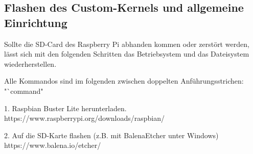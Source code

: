 \documentclass[12pt,a4paper,bibliography=totoc,listof=totoc]{scrartcl}
\begin{document}
\subsection{Flashen des Custom-Kernels und allgemeine Einrichtung}
Sollte die SD-Card des Raspberry Pi abhanden kommen oder zerstört werden, lässt sich mit den folgenden Schritten das Betriebsystem und das Dateisystem wiederherstellen.

Alle Kommandos sind im folgenden zwischen doppelten Anführungsstrichen: "`command"\,

1. Raspbian Buster Lite herunterladen.
   https://www.raspberrypi.org/downloads/raspbian/
\newline

2. Auf die SD-Karte flashen (z.B. mit BalenaEtcher unter Windows)\newline
   https://www.balena.io/etcher/
\newline
\end{document}
